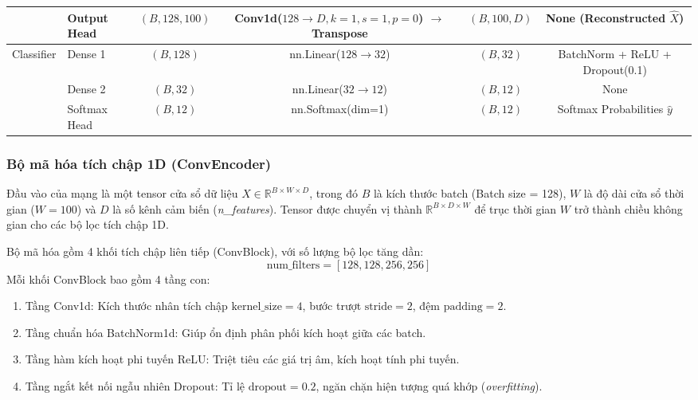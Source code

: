 \documentclass[11pt,journal,onecolumn]{IEEEtran}
\begin{document}
\begin{table}[htbp]
\begin{tabular}{llcccc}
& Output Head & $(B, 128, 100)$ & Conv1d($128 \rightarrow D, k=1, s=1, p=0$) $\rightarrow$ Transpose & $(B, 100, D)$ & None (Reconstructed $\hat{X}$) \\
\midrule
\multirow{3}{*}{Classifier}
& Dense 1 & $(B, 128)$ & nn.Linear($128 \rightarrow 32$) & $(B, 32)$ & BatchNorm + ReLU + Dropout(0.1) \\
& Dense 2 & $(B, 32)$ & nn.Linear($32 \rightarrow 12$) & $(B, 12)$ & None \\
& Softmax Head & $(B, 12)$ & nn.Softmax(dim=1) & $(B, 12)$ & Softmax Probabilities $\hat{y}$ \\
\bottomrule
\end{tabular}
\end{table}

\subsubsection{Bộ mã hóa tích chập 1D (ConvEncoder)}
Đầu vào của mạng là một tensor cửa sổ dữ liệu $X \in \mathbb{R}^{B \times W \times D}$, trong đó $B$ là kích thước batch (Batch size = 128), $W$ là độ dài cửa sổ thời gian ($W = 100$) và $D$ là số kênh cảm biến (\textit{n\_features}). Tensor được chuyển vị thành $\mathbb{R}^{B \times D \times W}$ để trục thời gian $W$ trở thành chiều không gian cho các bộ lọc tích chập 1D.

Bộ mã hóa gồm 4 khối tích chập liên tiếp (ConvBlock), với số lượng bộ lọc tăng dần:
\begin{equation}
\text{num\_filters} = [128, 128, 256, 256]
\end{equation}
Mỗi khối ConvBlock bao gồm 4 tầng con:
\begin{enumerate}
    \item Tầng Conv1d: Kích thước nhân tích chập $\text{kernel\_size} = 4$, bước trượt $\text{stride} = 2$, đệm $\text{padding} = 2$.
    \item Tầng chuẩn hóa BatchNorm1d: Giúp ổn định phân phối kích hoạt giữa các batch.
    \item Tầng hàm kích hoạt phi tuyến ReLU: Triệt tiêu các giá trị âm, kích hoạt tính phi tuyến.
    \item Tầng ngắt kết nối ngẫu nhiên Dropout: Tỉ lệ $\text{dropout} = 0.2$, ngăn chặn hiện tượng quá khớp (\textit{overfitting}).
\end{enumerate}
\end{document}
